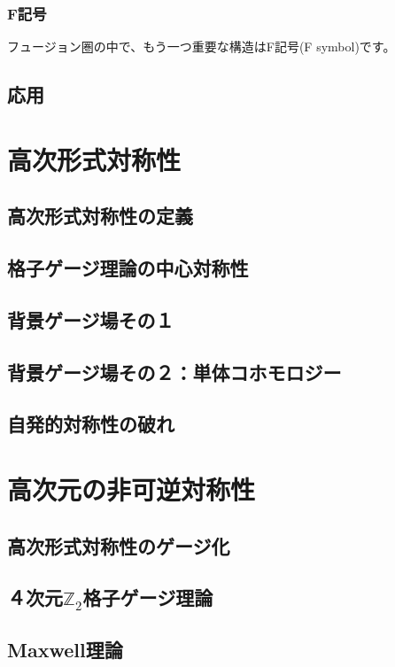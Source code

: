 \documentclass[report,paper=a4, fontsize=12pt, line_length=16cm, number_of_lines=33,dvipdfmx]{jlreq}
\numberwithin{equation}{chapter}
\newcommand{\Ztwo}{\mbox{$\mathbb{Z}_{2}$}}
\begin{document}
\subsection{F記号}
フュージョン圏の中で、もう一つ重要な構造はF記号(F symbol)です。

\section{応用}


\chapter{高次形式対称性}
\section{高次形式対称性の定義}
\section{格子ゲージ理論の中心対称性}
\section{背景ゲージ場その１}
\section{背景ゲージ場その２：単体コホモロジー}
\section{自発的対称性の破れ}


\chapter{高次元の非可逆対称性}
\section{高次形式対称性のゲージ化}
\section{４次元\texorpdfstring{\Ztwo}{Z2}格子ゲージ理論}
\section{Maxwell理論}



\end{document}
